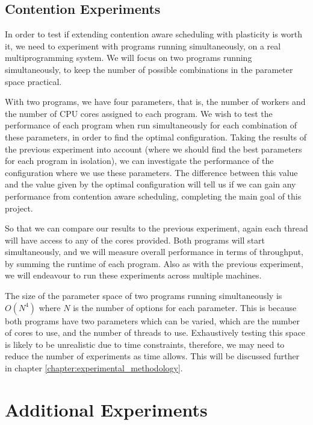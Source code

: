 \subsection{Contention Experiments}
\label{section:design:contention_experiments}

In order to test if extending contention aware scheduling with plasticity is worth it, we need to experiment with programs running simultaneously, on a real multiprogramming system. We will focus on two programs running simultaneously, to keep the number of possible combinations in the parameter space practical. 

With two programs, we have four parameters, that is, the number of workers and the number of CPU cores assigned to each program. We wish to test the performance of each program when run simultaneously for each combination of these parameters, in order to find the optimal configuration. Taking the results of the previous experiment into account (where we should find the best parameters for each program in isolation), we can investigate the performance of the configuration where we use these parameters. The difference between this value and the value given by the optimal configuration will tell us if we can gain any performance from contention aware scheduling, completing the main goal of this project.

So that we can compare our results to the previous experiment, again each thread will have access to any of the cores provided. Both programs will start simultaneously, and we will measure overall performance in terms of throughput, by summing the runtime of each program. Also as with the previous experiment, we will endeavour to run these experiments across multiple machines.

The size of the parameter space of two programs running simultaneously is $O(N^4)$ where $N$ is the number of options for each parameter. This is because both programs have two parameters which can be varied, which are the number of cores to use, and the number of threads to use. Exhaustively testing this space is likely to be unrealistic due to time constraints, therefore, we may need to reduce the number of experiments as time allows. This will be discussed further in chapter \ref{chapter:experimental_methodology}.



\section{Additional Experiments}
\label{section:design:additional_experiments}

